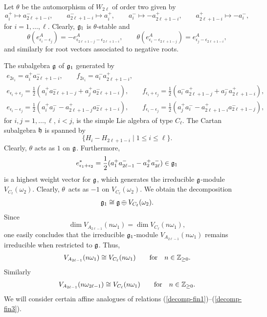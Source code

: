 \documentclass[11pt]{article}
\newcommand{\Z}{\Bbb Z}
\newcommand{\Zp} {\Z _ {\ge 0} }
\newcommand{\1}{\bf 1}
\begin{document}
Let $\theta$ be the automorphism of $W_{2 \ell}$ of order two given
by
%
\[  a_{i} ^+ \mapsto  a_{2\ell+1-i} ^{-}, \qquad a_{2\ell+1-i} ^-
\mapsto  a_{i} ^{+}, \qquad a_{i} ^-  \mapsto - a_{2\ell+1-i} ^+,
\qquad a_{2\ell+1-i} ^+ \mapsto - a_{i} ^-,\]
for $i =1, \dots, \ell$. Clearly, $\frak g _1$ is $\theta$-stable
and \[
\theta (e_{\epsilon_i-\epsilon_j}^A)=- e_{\epsilon_{2\ell
+1-j}-\epsilon_{2\ell +1-i}}^A, \qquad \theta
(e_{\epsilon_i-\epsilon_{2\ell +1-j}}^A)=
e_{\epsilon_{j}-\epsilon_{2\ell +1-i}}^A,
\]
%
and similarly for root vectors associated to negative roots.


The subalgebra $\frak g$ of $\frak g _1$ generated by
\begin{gather*}
  e_{2 \epsilon _{i}} =a_i ^+  a_{2\ell +1-i} ^-, \qquad
    f_{2 \epsilon _{i}}=a_i ^-  a_{2\ell +1-i} ^+,
  \\
  e_{\epsilon _{i}+ \epsilon _{j}}=\frac{1}{2}(a_i ^+
 a_{2\ell +1-j} ^- + a_j ^+  a_{2\ell +1-i} ^-), \qquad
 f_{\epsilon _{i}+ \epsilon _{j}}=\frac{1}{2}(a_i ^- a_{2\ell +1-j}
^+ + a_j ^-  a_{2\ell +1-i} ^+),   \\
  e_{\epsilon _{i}- \epsilon _{j}}=\frac{1}{2}(a_i ^+
 a_{j} ^- - a_{2\ell +1-j} ^+
 a_{2\ell +1-i} ^-), \qquad
f_{\epsilon _{i}- \epsilon _{j}}=\frac{1}{2}(a_j ^+
 a_{i} ^- - a_{2\ell +1-i} ^+
 a_{2\ell +1-j} ^-),
\end{gather*}
for $i,j =1, \dots, \ell$, $i<j$, is the simple Lie algebra of type
$C_{\ell}$. The Cartan subalgebra $\frak h$ is spanned by
\[
\{ H_i - H_{2\ell +1-i}  \; \vert \; 1 \le i \le  \ell \}.
\]
Clearly, $\theta$ acts as $1$ on $\frak g$. Furthermore, \[
e_{\epsilon _{1}+ \epsilon _{2}} ^*=\frac{1}{2}(a_1 ^+
 a_{2\ell -1} ^- - a_2 ^+  a_{2\ell} ^-) \in \frak g _1
\]
is a highest weight vector for $\frak g$, which generates the
irreducible $\frak g$-module $V_{C_{\ell}}(\omega _2)$. Clearly,
$\theta$~acts as $-1$ on $V_{C_{\ell}}(\omega _2)$. We obtain the
decomposition
\begin{gather} \label{decomp-fin1}
 \frak g _1 \cong \frak g \oplus V_{C_{\ell}}(\omega _2).
  \end{gather}
Since
%
\[ \dim V_{A_{2\ell -1}} (n \omega_1) = \dim V_{C_{\ell }} (n
\omega_1),\] one easily concludes that the irreducible $\frak g
_1$-module $V_{A_{2\ell -1}} (n \omega_1)$ remains irreducible when
restricted to $\frak g$. Thus,
\begin{gather} \label{decomp-fin2} V_{A_{2\ell -1} } (n \omega_1) \cong V_{C_{
\ell  } } (n \omega_1) \qquad \mbox{for} \quad n \in \Zp.
\end{gather}
Similarly
\begin{gather} \label{decomp-fin3} V_{A_{2\ell -1} } (n \omega_{2 \ell -1})
\cong V_{C_{ \ell  } } (n \omega_1) \qquad \mbox{for} \quad n \in \Zp.
\end{gather}
We will consider certain af\/f\/ine analogues of relations
(\ref{decomp-fin1})--(\ref{decomp-fin3}).
\end{document}
